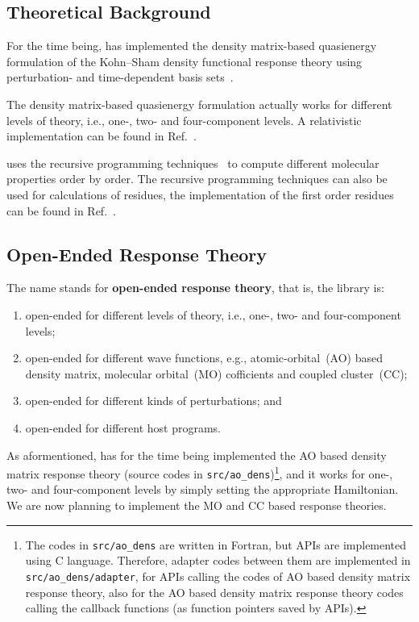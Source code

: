 \subsection{Theoretical Background}
\label{subsection-theory}

For the time being, \LibName has implemented the density matrix-based
quasienergy formulation of the Kohn--Sham density functional response theory
using perturbation- and time-dependent basis
sets~\cite{Thorvaldsen-JCP-129-214108,Bast-PCCP-13-2627}.

The density matrix-based quasienergy formulation actually works for different
levels of theory, i.e., one-, two- and four-component levels. A relativistic
implementation can be found in Ref.~\cite{Bast-CP-356-177}.

\LibName uses the recursive programming techniques~\cite{Ringholm-JCC-35-622}
to compute different molecular properties order by order. The recursive
programming techniques can also be used for calculations of residues, the
implementation of the first order residues can be found in
Ref.~\cite{Friese-JCTC-11-1129}.

\subsection{Open-Ended Response Theory}
\label{subsection-open-ended}

The name \LibName stands for \textbf{open-ended response theory}, that is,
the library is:
\begin{enumerate}
  \item open-ended for different levels of theory, i.e., one-, two- and
    four-component levels;
  \item open-ended for different wave functions, e.g., atomic-orbital~(AO)
    based density matrix, molecular orbital~(MO) cofficients and
    coupled cluster~(CC);
  \item open-ended for different kinds of perturbations; and
  \item open-ended for different host programs.
\end{enumerate}

As aformentioned, \LibName has for the time being implemented the AO based
density matrix response theory (source codes in
\texttt{src/ao\_dens})\footnote{The codes in \texttt{src/ao\_dens} are written
in Fortran, but \LibName APIs are implemented using C language. Therefore,
adapter codes between them are implemented in \texttt{src/ao\_dens/adapter},
for \LibName APIs calling the codes of AO based density matrix response theory,
also for the AO based density matrix response theory codes calling the callback
functions (as function pointers saved by \LibName APIs).}, and it works for
one-, two- and four-component levels by simply setting the appropriate
Hamiltonian. We are now planning to implement the MO and CC based response
theories.

